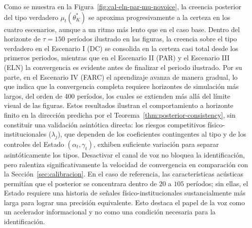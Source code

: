 \documentclass[review,authoryear,12pt]{elsarticle}
\theoremstyle{plain}
\theoremstyle{definition}
\newcommand{\1}{\mathbf{1}}
\begin{document}
Como se muestra en la Figura~\ref{fig:cal-eln-par-mu-novoice}, la creencia posterior del tipo verdadero $\mu_t(\theta_K^\ast)$ se aproxima progresivamente a la certeza en los cuatro escenarios, aunque a un ritmo más lento que en el caso base. Dentro del horizonte de $\tau = 150$ períodos ilustrado en las figuras, la creencia sobre el tipo verdadero en el Escenario I (DC) se consolida en la certeza casi total desde los primeros periodos, mientras que en el Escenario II (PAR) y el Escenario III (ELN) la convergencia es evidente antes de finalizar el periodo ilustrado. Por su parte, en el Escenario IV (FARC) el aprendizaje avanza de manera gradual, lo que indica que la convergencia completa requiere horizontes de simulación más largos, del orden de 400 períodos, los cuales se extienden más allá del límite visual de las figuras. Estos resultados ilustran el comportamiento a horizonte finito en la dirección predicha por el Teorema~\ref{thm:posterior-consistency}, sin constituir una validación asintótica directa: los riesgos competitivos físico-institucionales ($\lambda_j$), que dependen de los coeficientes contingentes al tipo y de los controles del Estado $(\alpha_t, \gamma_t)$, exhiben suficiente variación para separar asintóticamente los tipos. Desactivar el canal de voz no bloquea la identificación, pero ralentiza significativamente la velocidad de convergencia en comparación con la Sección~\ref{sec:calibracion}. En el caso de referencia, las características acústicas permitían que el posterior se concentrara dentro de $20$ a $105$ períodos; sin ellas, el Estado requiere una historia de señales físico-institucionales sustancialmente más larga para lograr una precisión equivalente. Esto destaca el papel de la voz como un acelerador informacional y no como una condición necesaria para la identificación.
\end{document}
